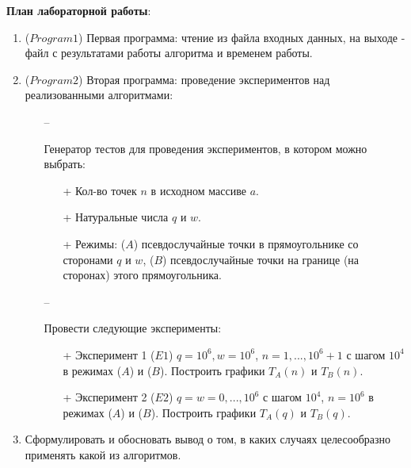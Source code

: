 \newpage

\noindent \textbf{План лабораторной работы}:
\begin{enumerate}
	\item{($Program1$) Первая программа: чтение из файла входных данных, на выходе - файл с результатами работы алгоритма и временем работы.}
	\item{($Program2$) Вторая программа: проведение экспериментов над реализованными алгоритмами:
		\begin{itemize}
			\item[--]{Генератор тестов для проведения экспериментов, в котором можно выбрать:
				\begin{itemize}
					\item[+]{Кол-во точек $n$ в исходном массиве $a$.}
					\item[+]{Натуральные числа $q$ и $w$.}
					\item[+]{Режимы: ($A$) псевдослучайные точки в прямоугольнике со сторонами $q$ и $w$, ($B$) псевдослучайные точки на границе (на сторонах) этого прямоугольника.}
			\end{itemize}}
			\item[--]{Провести следующие эксперименты:
				\begin{itemize}
					\item[+]{Эксперимент 1 ($E1$) $q = 10^6, w = 10^6$, $n = 1, ..., 10^6+1$ с шагом $10^4$ в режимах ($A$) и ($B$). Построить графики $T_A(n)$ и $T_B(n)$.}
					\item[+]{Эксперимент 2 ($E2$) $q = w = 0, ..., 10^6$ с шагом $10^4$, $n = 10^6$ в режимах ($A$) и ($B$). Построить графики $T_A(q)$ и $T_B(q)$.}
			\end{itemize}}
		\end{itemize}
	}
	\item{Сформулировать и обосновать вывод о том, в каких случаях целесообразно применять какой из алгоритмов.}
\end{enumerate}

\newpage

